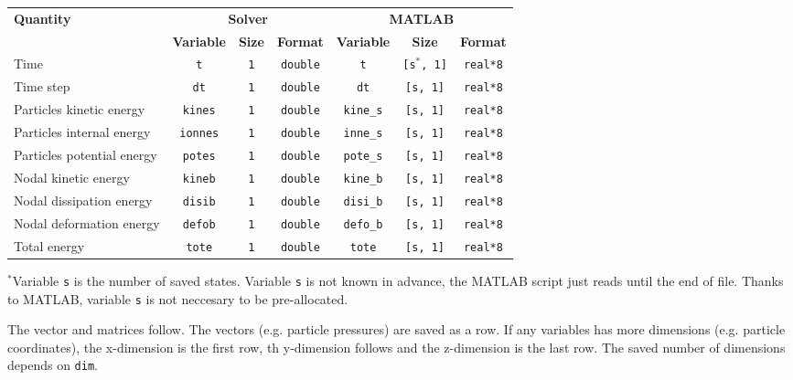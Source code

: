 {\footnotesize
\begin{tabular}{|l|c|c|c|c|c|c|}%
\hline
\multirow{2}{*}{\bf Quantity} & \multicolumn{3}{c|}{\bf Solver} &\multicolumn{3}{c|}{\bf MATLAB} \\ \cline{2-7}
& {\bf Variable} & {\bf Size} & {\bf Format} & {\bf Variable} & {\bf Size} & {\bf Format} \\ \hline
Time & \texttt{t} & \texttt{1} & \texttt{double} & \texttt{t} & \texttt{[s$^*$, 1]} & \texttt{real*8} \\ \hline
Time step & \texttt{dt} & \texttt{1} & \texttt{double} & \texttt{dt} & \texttt{[s, 1]} & \texttt{real*8} \\ \hline
Particles kinetic energy & \texttt{kines} & \texttt{1} & \texttt{double} & \texttt{kine\_s} & \texttt{[s, 1]} & \texttt{real*8} \\ \hline
Particles internal energy & \texttt{ionnes} & \texttt{1} & \texttt{double} & \texttt{inne\_s} & \texttt{[s, 1]} & \texttt{real*8} \\ \hline
Particles potential energy & \texttt{potes} & \texttt{1} & \texttt{double} & \texttt{pote\_s} & \texttt{[s, 1]} & \texttt{real*8} \\ \hline
Nodal kinetic energy & \texttt{kineb} & \texttt{1} & \texttt{double} & \texttt{kine\_b} & \texttt{[s, 1]} & \texttt{real*8} \\ \hline
Nodal dissipation energy & \texttt{disib} & \texttt{1} & \texttt{double} & \texttt{disi\_b} & \texttt{[s, 1]} & \texttt{real*8} \\ \hline
Nodal deformation energy & \texttt{defob} & \texttt{1} & \texttt{double} & \texttt{defo\_b} & \texttt{[s, 1]} & \texttt{real*8} \\ \hline
Total energy & \texttt{tote} & \texttt{1} & \texttt{double} & \texttt{tote} & \texttt{[s, 1]} & \texttt{real*8} \\ \hline
\end{tabular}
}

$^*$Variable \texttt{s} is the number of saved states. Variable \texttt{s} is not known in advance, the MATLAB script just reads until the end of file. Thanks to MATLAB, variable \texttt{s} is not neccesary to be pre-allocated.

The vector and matrices follow. The vectors (e.g. particle pressures) are saved as a row. If any variables has more dimensions (e.g. particle coordinates), the x-dimension is the first row, th y-dimension follows and the z-dimension is the last row. The saved number of dimensions depends on \texttt{dim}.

